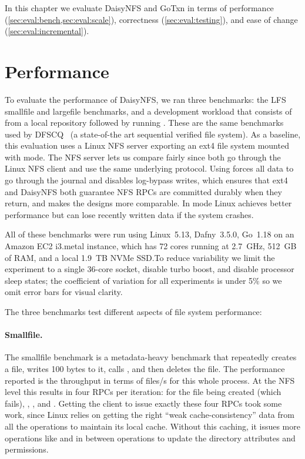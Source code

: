 In this chapter we evaluate DaisyNFS and GoTxn in terms of performance
(\cref{sec:eval:bench,sec:eval:scale}), correctness (\cref{sec:eval:testing}),
and ease of change (\cref{sec:eval:incremental}).


\section{Performance}
\label{sec:eval:bench}

To evaluate the performance of DaisyNFS, we ran three benchmarks: the LFS smallfile
and largefile benchmarks, and a development workload that consists of  from a local repository followed by running . These are the same
benchmarks used by DFSCQ~\cite{chen:dfscq} (a state-of-the art sequential
verified file system). As a baseline, this evaluation uses a Linux
NFS server exporting an ext4 file system mounted with  mode.
The NFS server lets us compare fairly since both go through the Linux NFS client
and use the same underlying protocol. Using  forces all data to
go through the journal and disables log-bypass writes, which ensures that
ext4 and DaisyNFS both guarantee NFS RPCs are committed durably when they
return, and makes the designs more comparable. In
 mode Linux achieves better performance but can
lose recently written data if the system crashes.

All of these benchmarks were run using Linux~5.13, Dafny~3.5.0, Go~1.18 on an Amazon
EC2 i3.metal instance, which has 72 cores running at 2.7~GHz, 512~GB of RAM, and a local 1.9~TB
NVMe SSD.\@ To reduce variability we limit the experiment to a single 36-core
socket, disable turbo boost, and disable processor sleep states; the coefficient
of variation for all experiments is under 5\% so we omit error bars for visual
clarity.

The three benchmarks test different aspects of file system performance:

\paragraph{Smallfile.}
The smallfile benchmark is a metadata-heavy benchmark that repeatedly creates a
file, writes 100 bytes to it, calls , and then deletes the file. The
performance reported is the throughput in terms of files/s for this whole process. At
the NFS level this results in four RPCs per iteration:  for the file
being created (which fails), , , and . Getting
the client to issue exactly these four RPCs took some work, since Linux relies
on getting the right ``weak cache-consistency'' data from all the operations to
maintain its local cache. Without this caching, it issues more operations like
 and  in between operations to update the directory
attributes and permissions.

